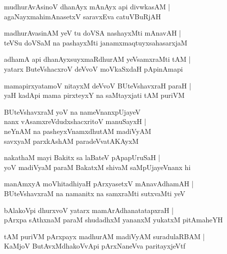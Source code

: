 \documentclass[twoside,12pt,openright]{book}
\newcounter{shloka}[chapter]
\begin{document}
\begin{shloka}%
mudhurAvAsinoV dhanAyx mAnAyx api divwkasAM |\\
agaNayxmahimAnasetxV saravxEva catuVBuRjAH 
\end{shloka}

\begin{shloka}%
madhurAvasinAM yeV tu doVSA nashayxMti mAnavAH |\\
teVSu doVSaM na pashayxMti janamxmaqtuyxsahasarxjaM 
\end{shloka}

\begin{shloka}%
adhamA api dhanAyxsuyxmaRdhurAM yeVsamxraMti tAM |\\
yatarx ButeVshacxroV deVvoV moVkaSxdaH pApinAmapi
\end{shloka}

\begin{shloka}%
mamapirxyatamoV nitayxM deVvoV BUteVshavxraH paraH |\\
yaH kadApi mama pirxteyxY na saMtayxjati tAM puriVM 
\end{shloka}

\begin{shloka}%
BUteVshavxraM yoV na nameVnanxpUjayeV \\
nanx vAsamxreVdudxshacxritoV manuSayxH |\\
neYnAM na pasheyxVnamxdhutAM madiVyAM \\
savxyaM parxkAshAM paradeVvatAKAyxM 
\end{shloka}

\begin{shloka}%
nakathaM mayi Bakitx sa laBateV pApapUruSaH |\\
yoV madiVyaM paraM BakatxM shivaM saMpUjayeVnanx hi 
\end{shloka}

\begin{shloka}%
manAmxyA moVhitadhiyaH pArxyasetxV mAnavAdhamAH |\\
BUteVshavxraM na namanitx na samxraMti sutxvaMti yeV 
\end{shloka}

\begin{shloka}%
bAlakoVpi dhurxvoV yatarx mamArAdhanatatapxraH |\\
pArxpa sAthxnaM paraM shudadhxM yananxM yukatxM pitAmaheYH
\end{shloka}

\begin{shloka}%
tAM puriVM pArxpayx madhurAM madiVyAM suradulaRBAM |\\
KaMjoV ButAvxMdhakoVvApi pArxNaneVva paritayxjeVtf 
\end{shloka}
\end{document}

